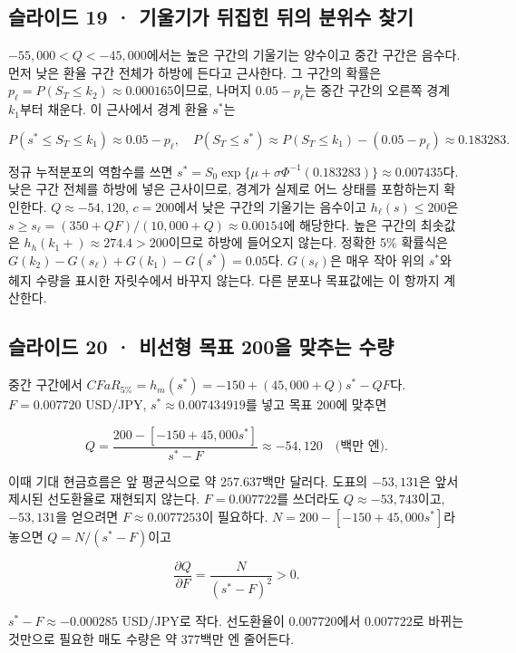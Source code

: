\documentclass[11pt,a4paper]{article}
\begin{document}
\subsection{슬라이드 19 · 기울기가 뒤집힌 뒤의 분위수 찾기}
$-55{,}000<Q<-45{,}000$에서는 높은 구간의 기울기는 양수이고 중간 구간은 음수다. 먼저 낮은 환율 구간 전체가 하방에 든다고 근사한다. 그 구간의 확률은 $p_\ell=P(S_T\leq k_2)\approx0.000165$이므로, 나머지 $0.05-p_\ell$는 중간 구간의 오른쪽 경계 $k_1$부터 채운다. 이 근사에서 경계 환율 $s^*$는\par

\[
P(s^*\leq S_T\leq k_1)\approx0.05-p_\ell,
\quad P(S_T\leq s^*)\approx P(S_T\leq k_1)-(0.05-p_\ell)
\approx0.183283.
\]

정규 누적분포의 역함수를 쓰면 $s^*=S_0\exp\{\mu+\sigma\Phi^{-1}(0.183283)\}\approx0.007435$다. 낮은 구간 전체를 하방에 넣은 근사이므로, 경계가 실제로 어느 상태를 포함하는지 확인한다. $Q\approx-54{,}120$, $c=200$에서 낮은 구간의 기울기는 음수이고 $h_\ell(s)\leq200$은 $s\geq s_\ell=(350+QF)/(10{,}000+Q)\approx0.00154$에 해당한다. 높은 구간의 최솟값은 $h_h(k_1+)\approx274.4>200$이므로 하방에 들어오지 않는다. 정확한 5\% 확률식은 $G(k_2)-G(s_\ell)+G(k_1)-G(s^*)=0.05$다. $G(s_\ell)$은 매우 작아 위의 $s^*$와 헤지 수량을 표시한 자릿수에서 바꾸지 않는다. 다른 분포나 목표값에는 이 항까지 계산한다.\par

\subsection{슬라이드 20 · 비선형 목표 200을 맞추는 수량}
중간 구간에서 $CFaR_{5\%}=h_m(s^*)=-150+(45{,}000+Q)s^*-QF$다. $F=0.007720$ USD/JPY, $s^*\approx0.007434919$를 넣고 목표 $200$에 맞추면\par

\[
Q=\frac{200-[-150+45{,}000s^*]}{s^*-F}
\approx-54{,}120\quad\text{(백만 엔)}.
\]

이때 기대 현금흐름은 앞 평균식으로 약 $257.637$백만 달러다. 도표의 $-53{,}131$은 앞서 제시된 선도환율로 재현되지 않는다. $F=0.007722$를 쓰더라도 $Q\approx-53{,}743$이고, $-53{,}131$을 얻으려면 $F\approx0.0077253$이 필요하다. $N=200-[-150+45{,}000s^*]$라 놓으면 $Q=N/(s^*-F)$이고\par

\[
\frac{\partial Q}{\partial F}=\frac{N}{(s^*-F)^2}>0.
\]

$s^*-F\approx-0.000285$ USD/JPY로 작다. 선도환율이 $0.007720$에서 $0.007722$로 바뀌는 것만으로 필요한 매도 수량은 약 377백만 엔 줄어든다.\par
\end{document}

